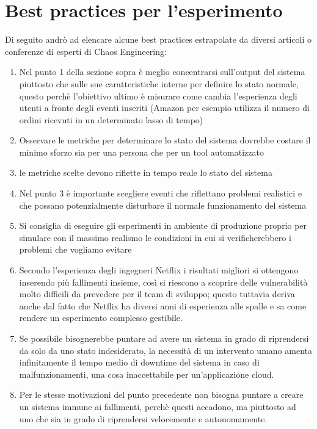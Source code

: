 \section{Best practices per l'esperimento}
Di seguito andrò ad elencare alcune best practices estrapolate da diversi articoli o conferenze di esperti di Chaos Engineering:
\begin{enumerate}
    \item Nel punto 1 della sezione sopra è meglio concentrarsi sull'output del sistema piuttosto che sulle sue caratteristiche interne per definire lo stato normale, questo perchè l'obiettivo ultimo è misurare come cambia l'esperienza degli utenti a fronte degli eventi inseriti (Amazon per esempio utilizza il numero di ordini ricevuti in un determinato lasso di tempo)
    \item Osservare le metriche per determinare lo stato del sistema dovrebbe costare il minimo sforzo sia per una persona che per un tool automatizzato
    \item le metriche scelte devono riflette in tempo reale lo stato del sistema
    \item Nel punto 3 è importante scegliere eventi che riflettano problemi realistici e che possano potenzialmente disturbare il normale funzionamento del sistema
    \item Si consiglia di eseguire gli esperimenti in ambiente di produzione proprio per simulare con il massimo realismo le condizioni in cui si verificherebbero i problemi che vogliamo evitare
    \item Secondo l'esperienza degli ingegneri Netflix i risultati migliori si ottengono inserendo più fallimenti insieme, così si riescono a scoprire delle vulnerabilità molto difficili da prevedere per il team di sviluppo; questo tuttavia deriva anche dal fatto che Netflix ha diversi anni di esperienza alle spalle e sa come rendere un esperimento complesso gestibile.
    \item Se possibile bisognerebbe puntare ad avere un sistema in grado di riprendersi da solo da uno stato indesiderato, la necessità di un intervento umano amenta infinitamente il tempo medio di downtime del sistema in caso di malfunzionamenti, una cosa inaccettabile per un'applicazione cloud.
    \item Per le stesse motivazioni del punto precedente non bisogna puntare a creare un sistema immune ai fallimenti, perchè questi accadono, ma piuttosto ad uno che sia in grado di riprendersi velocemente e autonomamente.
\end{enumerate}

